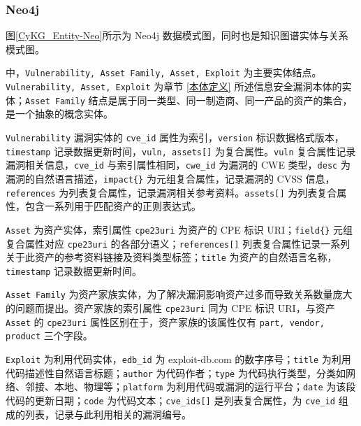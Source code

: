 \documentclass[a4paper,AutoFakeBold,oneside,12pt]{book}
\begin{document}

\subsubsection{Neo4j}

图\ref{CyKG_Entity-Neo}所示为 Neo4j 数据模式图，同时也是知识图谱实体与关系模式图。


中，\lstinline|Vulnerability, Asset Family, Asset, Exploit| 为主要实体结点。\lstinline|Vulnerability, Asset, Exploit| 为章节 \ref{本体定义} 所述信息安全漏洞本体的实体；\lstinline|Asset Family| 结点是属于同一类型、同一制造商、同一产品的资产的集合，是一个抽象的概念实体。

\lstinline|Vulnerability| 漏洞实体的 \lstinline|cve_id| 属性为索引，\lstinline|version| 标识数据格式版本，\lstinline|timestamp| 记录数据更新时间，\lstinline|vuln, assets[]| 为复合属性。\lstinline|vuln| 复合属性记录漏洞相关信息，\lstinline|cve_id| 与索引属性相同，\lstinline|cwe_id| 为漏洞的 CWE 类型，\lstinline|desc| 为漏洞的自然语言描述，\lstinline|impact{}| 为元组复合属性，记录漏洞的 CVSS 信息，\lstinline|references| 为列表复合属性，记录漏洞相关参考资料。\lstinline|assets[]| 为列表复合属性，包含一系列用于匹配资产的正则表达式。

\lstinline|Asset| 为资产实体，索引属性 \lstinline|cpe23uri| 为资产的 CPE 标识 URI；\lstinline|field{}| 元组复合属性对应 \lstinline|cpe23uri| 的各部分语义；\lstinline|references[]| 列表复合属性记录一系列关于此资产的参考资料链接及资料类型标签；\lstinline|title| 为资产的自然语言名称，\lstinline|timestamp| 记录数据更新时间。

\lstinline|Asset Family| 为资产家族实体，为了解决漏洞影响资产过多而导致关系数量庞大的问题而提出。资产家族的索引属性 \lstinline|cpe23uri| 同为 CPE 标识 URI，与资产 \lstinline|Asset| 的 \lstinline|cpe23uri| 属性区别在于，资产家族的该属性仅有 \lstinline|part, vendor, product| 三个字段。

\lstinline|Exploit| 为利用代码实体，\lstinline|edb_id| 为 exploit-db.com 的数字序号；\lstinline|title| 为利用代码描述性自然语言标题；\lstinline|author| 为代码作者；\lstinline|type| 为代码执行类型，分类如网络、邻接、本地、物理等；\lstinline|platform| 为利用代码或漏洞的运行平台；\lstinline|date| 为该段代码的更新日期；\lstinline|code| 为代码文本；\lstinline|cve_ids[]| 是列表复合属性，为 \lstinline|cve_id| 组成的列表，记录与此利用相关的漏洞编号。
\end{document}
